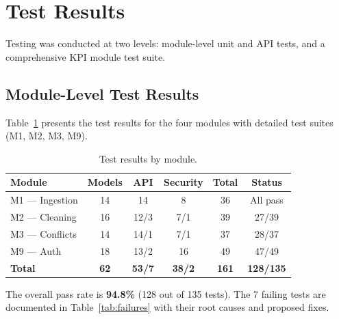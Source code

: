 \section{Test Results}

\noindent
Testing was conducted at two levels:
module-level unit and API tests,
and a comprehensive KPI module test suite.

\subsection{Module-Level Test Results}

\noindent
Table~\ref{tab:tests} presents the test results
for the four modules with detailed test suites
(M1, M2, M3, M9).

\begin{table}[h!]
\centering
\caption{Test results by module.}
\label{tab:tests}
\renewcommand{\arraystretch}{1.3}
\begin{tabular}{|l|c|c|c|c|c|}
\hline
\textbf{Module} & \textbf{Models} & \textbf{API} & \textbf{Security} & \textbf{Total} & \textbf{Status} \\
\hline
M1 — Ingestion  & 14 & 14 & 8 & 36  & All pass \\
M2 — Cleaning   & 16 & 12/3 & 7/1 & 39 & 27/39 \\
M3 — Conflicts  & 14 & 14/1 & 7/1 & 37 & 28/37 \\
M9 — Auth       & 18 & 13/2 & 16 & 49 & 47/49 \\
\hline
\textbf{Total}  & \textbf{62} & \textbf{53/7} & \textbf{38/2} & \textbf{161} & \textbf{128/135} \\
\hline
\end{tabular}
\end{table}

\noindent
The overall pass rate is \textbf{94.8\%}
(128 out of 135 tests).
The 7 failing tests are documented in Table~\ref{tab:failures}
with their root causes and proposed fixes.

